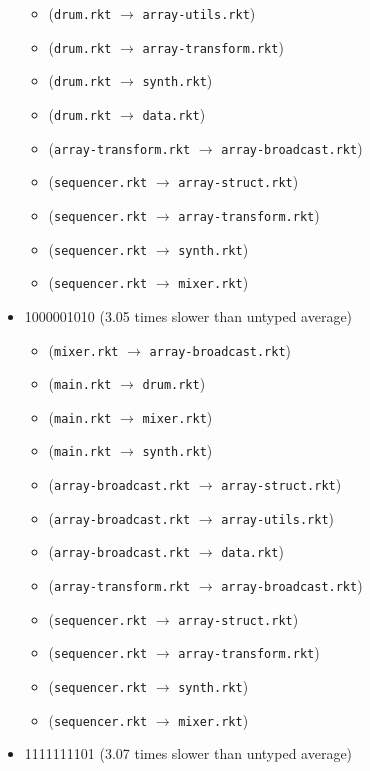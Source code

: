 \documentclass{article}
\newcommand{\mono}[1]{\texttt{#1}}
\begin{document}
\begin{itemize}
\begin{itemize}
  \item (\mono{drum.rkt} $\rightarrow$ \mono{array-utils.rkt})
  \item (\mono{drum.rkt} $\rightarrow$ \mono{array-transform.rkt})
  \item (\mono{drum.rkt} $\rightarrow$ \mono{synth.rkt})
  \item (\mono{drum.rkt} $\rightarrow$ \mono{data.rkt})
  \item (\mono{array-transform.rkt} $\rightarrow$ \mono{array-broadcast.rkt})
  \item (\mono{sequencer.rkt} $\rightarrow$ \mono{array-struct.rkt})
  \item (\mono{sequencer.rkt} $\rightarrow$ \mono{array-transform.rkt})
  \item (\mono{sequencer.rkt} $\rightarrow$ \mono{synth.rkt})
  \item (\mono{sequencer.rkt} $\rightarrow$ \mono{mixer.rkt})
  \end{itemize}
\item 1000001010 (3.05 times slower than untyped average)
  \begin{itemize}
  \item (\mono{mixer.rkt} $\rightarrow$ \mono{array-broadcast.rkt})
  \item (\mono{main.rkt} $\rightarrow$ \mono{drum.rkt})
  \item (\mono{main.rkt} $\rightarrow$ \mono{mixer.rkt})
  \item (\mono{main.rkt} $\rightarrow$ \mono{synth.rkt})
  \item (\mono{array-broadcast.rkt} $\rightarrow$ \mono{array-struct.rkt})
  \item (\mono{array-broadcast.rkt} $\rightarrow$ \mono{array-utils.rkt})
  \item (\mono{array-broadcast.rkt} $\rightarrow$ \mono{data.rkt})
  \item (\mono{array-transform.rkt} $\rightarrow$ \mono{array-broadcast.rkt})
  \item (\mono{sequencer.rkt} $\rightarrow$ \mono{array-struct.rkt})
  \item (\mono{sequencer.rkt} $\rightarrow$ \mono{array-transform.rkt})
  \item (\mono{sequencer.rkt} $\rightarrow$ \mono{synth.rkt})
  \item (\mono{sequencer.rkt} $\rightarrow$ \mono{mixer.rkt})
  \end{itemize}
\item 1111111101 (3.07 times slower than untyped average)
  \begin{itemize}

\end{itemize}
\end{itemize}
\end{document}
